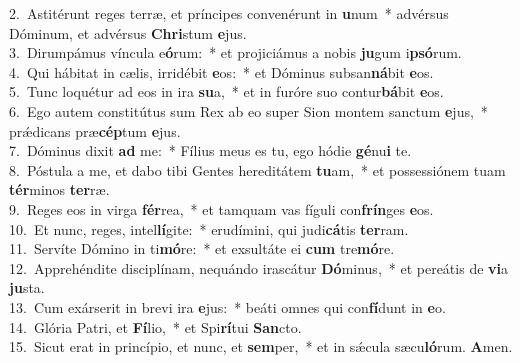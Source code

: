 {2.~}Astitérunt reges terræ, et príncipes convenérunt in \textbf{u}num~* advérsus Dóminum, et advérsus \textbf{Chri}stum \textbf{e}jus.\\
{3.~}Dirumpámus víncula e\textbf{ó}rum:~* et projiciámus a nobis \textbf{ju}gum i\textbf{psó}rum.\\
{4.~}Qui hábitat in cælis, irridébit \textbf{e}os:~* et Dóminus subsan\textbf{ná}bit \textbf{e}os.\\
{5.~}Tunc loquétur ad eos in ira \textbf{su}a,~* et in furóre suo contur\textbf{bá}bit \textbf{e}os.\\
{6.~}Ego autem constitútus sum Rex ab eo super Sion montem sanctum \textbf{e}jus,~* prǽdicans præ\textbf{cép}tum \textbf{e}jus.\\
{7.~}Dóminus dixit \textbf{ad} me:~* Fílius meus es tu, ego hódie \textbf{gé}nu\textbf{i} te.\\
{8.~}Póstula a me, et dabo tibi Gentes hereditátem \textbf{tu}am,~* et possessiónem tuam \textbf{tér}minos \textbf{ter}ræ.\\
{9.~}Reges eos in virga \textbf{fér}rea,~* et tamquam vas fíguli con\textbf{frín}ges \textbf{e}os.\\
{10.~}Et nunc, reges, intel\textbf{lí}gite:~* erudímini, qui judi\textbf{cá}tis \textbf{ter}ram.\\
{11.~}Servíte Dómino in ti\textbf{mó}re:~* et exsultáte ei \textbf{cum} tre\textbf{mó}re.\\
{12.~}Apprehéndite disciplínam, nequándo irascátur \textbf{Dó}minus,~* et pereátis de \textbf{vi}a \textbf{ju}sta.\\
{13.~}Cum exárserit in brevi ira \textbf{e}jus:~* beáti omnes qui con\textbf{fí}dunt in \textbf{e}o.\\
{14.~}Glória Patri, et \textbf{Fí}lio,~* et Spi\textbf{rí}tui \textbf{San}cto.\\
{15.~}Sicut erat in princípio, et nunc, et \textbf{sem}per,~* et in sǽcula sæcu\textbf{ló}rum. \textbf{A}men.\\
